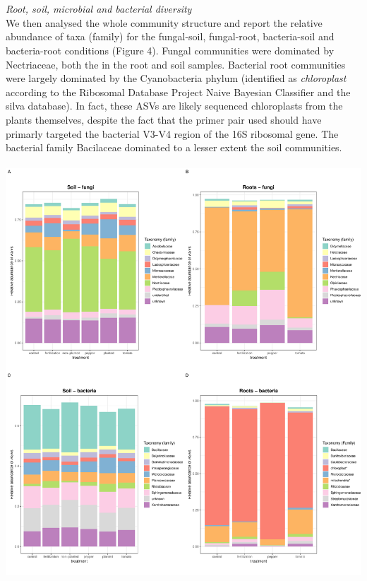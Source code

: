 \documentclass[11pt,]{article}
\begin{document}
~\\
\hspace*{0.333em}\\
\emph{Root, soil, microbial and bacterial diversity}\\
We then analysed the whole community structure and report the relative
abundance of taxa (family) for the fungal-soil, fungal-root,
bacteria-soil and bacteria-root conditions (Figure 4). Fungal
communities were dominated by Nectriaceae, both the in the root and soil
samples. Bacterial root communities were largely dominated by the
Cyanobacteria phylum (identified as \emph{chloroplast} according to the
Ribosomal Database Project Naive Bayesian Classifier and the silva
database). In fact, these ASVs are likely sequenced chloroplasts from
the plants themselves, despite the fact that the primer pair used should
have primarly targeted the bacterial V3-V4 region of the 16S ribosomal
gene. The bacterial family Bacilaceae dominated to a lesser extent the
soil communities.\\
\hspace*{0.333em}\\
\includegraphics[width=7.29167in]{../figures/Figure4_FAMILY_barplots.pdf}\\
\end{document}
